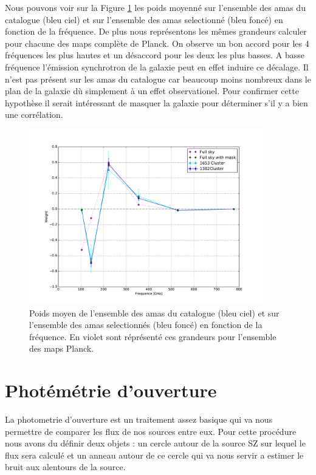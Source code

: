 \documentclass[a4paper,11pt]{article}
\begin{document}
Nous pouvons voir sur la Figure \ref{w_full} les poids moyenné sur
l'ensemble des amas du catalogue (bleu ciel) et sur l'ensemble des
amas selectionné (bleu foncé) en fonction de la fréquence. De plus
nous représentons les mêmes grandeurs calculer pour chacune des maps
complète de Planck. On observe un bon accord pour les 4 fréquences les
plus hautes et un désaccord pour les deux les plus basses. A basse
fréquence l'émission synchrotron de la galaxie peut en effet induire
ce décalage. Il n'est pas présent sur les amas du catalogue car
beaucoup moins nombreux dans le plan de la galaxie dù simplement à un
effet observationel. Pour confirmer cette hypothèse il serait
intéressant de masquer la galaxie pour déterminer s'il y a bien une
corrélation.  

\begin{figure}[h!]
  \centering
  \label{w_full}
  \includegraphics[width=4in]{w_full.pdf}
  \caption{Poids moyen de l'ensemble des amas du catalogue (bleu ciel) et sur
    l'ensemble des amas selectionnés (bleu foncé) en fonction
    de la fréquence. En violet sont réprésenté ces grandeurs pour
    l'ensemble des maps Planck.}
\end{figure}
  

\section{Photémétrie d'ouverture}
La photometrie d'ouverture est un traitement assez basique qui va nous 
permettre de comparer les flux de nos sources entre eux.
Pour cette procédure nous avons du définir deux objets : un cercle autour de la source SZ
sur lequel le flux sera calculé et un anneau autour de ce cercle qui va nous servir a estimer le bruit 
aux alentours de la source.
\end{document}
